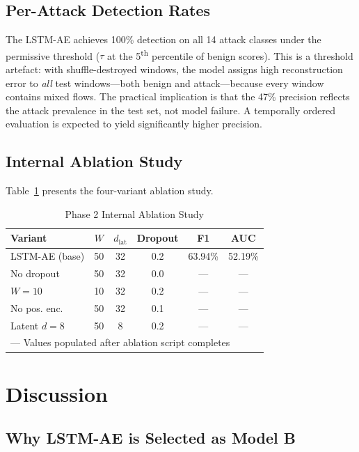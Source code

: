 \documentclass[conference]{IEEEtran}
\begin{document}
\subsection{Per-Attack Detection Rates}

The LSTM-AE achieves 100\% detection on all 14 attack classes under the permissive threshold
($\tau$ at the 5\textsuperscript{th} percentile of benign scores). This is a threshold
artefact: with shuffle-destroyed windows, the model assigns high reconstruction error to
\emph{all} test windows—both benign and attack—because every window contains mixed flows.
The practical implication is that the 47\% precision reflects the attack prevalence in the
test set, not model failure. A temporally ordered evaluation is expected to yield significantly
higher precision.

\subsection{Internal Ablation Study}

Table~\ref{tab:ablation_internal} presents the four-variant ablation study.

\begin{table}[htbp]
  \caption{Phase 2 Internal Ablation Study}
  \label{tab:ablation_internal}
  \centering
  \begin{tabular}{@{}lccccc@{}}
    \toprule
    Variant & $W$ & $d_\text{lat}$ & Dropout & F1 & AUC \\
    \midrule
    LSTM-AE (base) & 50 & 32 & 0.2 & 63.94\% & 52.19\% \\
    No dropout     & 50 & 32 & 0.0 & ---     & ---     \\
    $W=10$         & 10 & 32 & 0.2 & ---     & ---     \\
    No pos. enc.   & 50 & 32 & 0.1 & ---     & ---     \\
    Latent $d=8$   & 50 & 8  & 0.2 & ---     & ---     \\
    \bottomrule
    \multicolumn{6}{l}{\small --- Values populated after ablation script completes}
  \end{tabular}
\end{table}

\section{Discussion}

\subsection{Why LSTM-AE is Selected as Model B}
\end{document}
